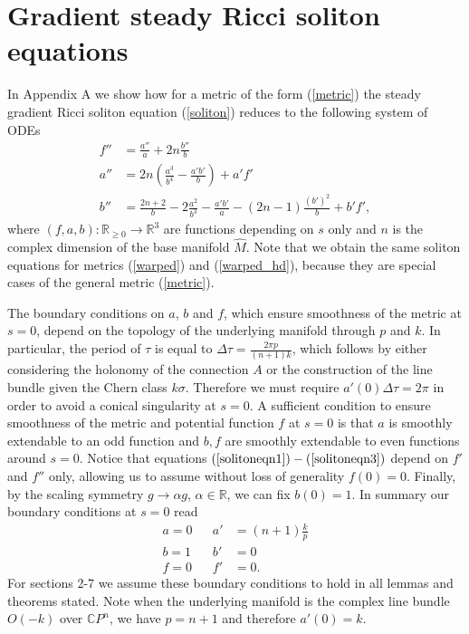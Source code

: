 \documentclass{amsart}
\theoremstyle{definition}
\theoremstyle{remark}
\numberwithin{equation}{section}
\newcommand{\R}{\mathbb{R}}  %
\begin{document}
\section{Gradient steady Ricci soliton equations}
In Appendix A we show how for a metric of the form (\ref{metric}) the steady gradient Ricci soliton equation (\ref{soliton}) reduces to the following system of ODEs 
\begin{align}
\label{solitoneqn1}
f'' &= \frac{a''}{a} + 2n \frac{b''}{b} \\
\label{solitoneqn2}
a''&= 2n\left(\frac{a^3}{b^4}- \frac{a'b'}{b}\right) + a'f' \\
\label{solitoneqn3}
b''&= \frac{2n+2}{b} - 2 \frac{a^2}{b^3}-\frac{a'b'}{a} - (2n-1)\frac{(b')^2}{b} + b'f',
\end{align} 
where $(f, a, b): \R_{\geq 0} \rightarrow \R^3$ are functions depending on $s$ only and $n$ is the complex dimension of the base manifold $\hat{M}$. Note that we obtain the same soliton equations for metrics (\ref{warped}) and (\ref{warped_hd}), because they are special cases of the general metric (\ref{metric}).

The boundary conditions on $a$, $b$ and $f$, which ensure smoothness of the metric at $s=0$, depend on the topology of the underlying manifold through $p$ and $k$. In particular, the period of $\tau$ is equal to $\Delta \tau =\frac{2\pi p}{(n+1)k}$, which follows by either considering the holonomy of the connection $A$ or the construction of the line bundle given the Chern class $k \sigma$. Therefore we must require $a'(0) \Delta \tau = 2\pi$ in order to avoid a conical singularity at $s=0$. A sufficient condition to ensure smoothness of the metric and potential function $f$ at $s=0$ is that $a$ is smoothly extendable to an odd function and $b,f$ are smoothly extendable to even functions around $s=0$. Notice that equations $(\ref{solitoneqn1})-(\ref{solitoneqn3})$ depend on $f'$ and $f''$ only, allowing us to assume without loss of generality $f(0) = 0$. Finally, by the scaling symmetry $g \rightarrow \alpha g$, $\alpha \in \R$, we can fix $b(0) = 1$. In summary our boundary conditions at $s=0$ read
\begin{align}
\label{boundaryconditions}
a = 0 && a' &= (n+1)\frac{k}{p} \\ \nonumber
b = 1 && b' &= 0 \\ \nonumber
f = 0 && f' &= 0.
\end{align}
For sections 2-7 we assume these boundary conditions to hold in all lemmas and theorems stated. Note when the underlying manifold is the complex line bundle $O(-k)$ over $\mathbb{C}P^n$, we have $p = n+1$ and therefore $a'(0) = k$.
\end{document}
